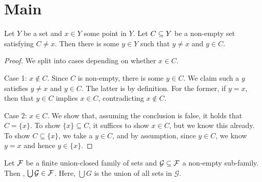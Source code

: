 %

\section{Main}

\begin{lemma} \label{small_lemma}
\leanok

Let $Y$ be a set and $x \in Y$ some point in $Y$. Let $C \subseteq Y$ be a non-empty set satisfying $C \ne {x}$. Then there is some $y \in Y$ such that $y \ne x$ and $y \in C$.
\end{lemma}

\begin{proof}
\leanok 

We split into cases depending on whether $x \in C$.

\vs

Case 1: $x \not \in C$. Since $C$ is non-empty, there is some $y \in C$. 
We claim such a $y$ satisfies $y \ne x$ and $y \in C$. The latter is by definition.
For the former, if $y = x$, then that $y \in C$ implies $x \in C$, contradicting $x \not \in C$.

\vs

Case 2: $x \in C$. We show that, assuming the conclusion is false, it holds that $C = \{x\}$. 
To show $\{x\} \subseteq C$, it suffices to show $x \in C$, but we know this already. To show
$C \subseteq \{x\}$, we take a $y \in C$, and by assumption, since $y \in C$, we know $y = x$
and hence $y \in \{x\}$.
\end{proof}


\vsss

\begin{proposition} \label{UGinF}
\leanok
{}
Let $\mathcal{F}$ be a finite union-closed family of sets and $\mathcal{G} \subseteq \mathcal{F}$ a non-empty sub-family. Then , $\bigcup \mathcal{G} \in \mathcal{F}$. Here, $\bigcup G$ is the union of all sets in $\mathcal{G}$. 
\end{proposition}

